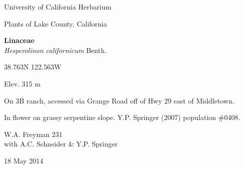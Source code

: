 \documentclass[letterpaper,10pt]{article}
\begin{document}
\begin{minipage}[t]{0.40\textwidth}

\begin{center}
University of California Herbarium \\
\begin{large}
Plants of Lake County, California \\
\end{large}
\vspace{\baselineskip}
\textbf{Linaceae} \\
\textit{Hesperolinon californicum} Benth.\\
\end{center}

\begin{footnotesize}

\begin{multicols}{2}
38.763\textdegree N 122.563\textdegree W
\columnbreak
\begin{flushright}
Elev. 315 m
\end{flushright}
\end{multicols}

On 3B ranch, accessed via Grange Road off of Hwy 29 east of Middletown.
\vspace{\baselineskip}

In flower on grassy serpentine slope. Y.P. Springer (2007) population \#0408.

\begin{multicols}{2}
W.A. Freyman 231 \\
with A.C. Schneider \& Y.P. Springer
\columnbreak
\begin{flushright}
18 May 2014
\end{flushright}
\end{multicols}

\end{footnotesize}

\end{minipage}

\vspace{2cm}
%
%

%
%
\end{document}
